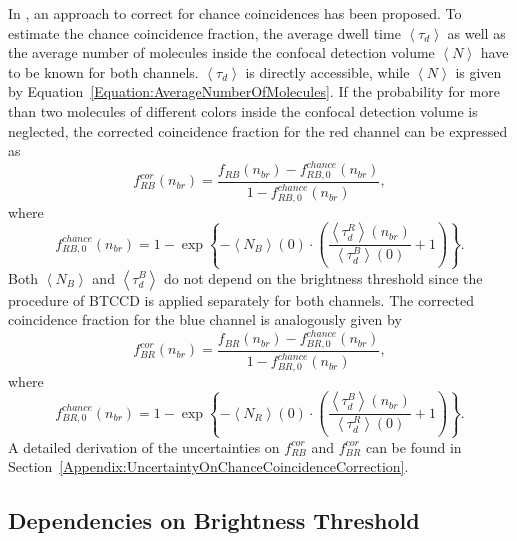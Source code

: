In \cite{Hoefig2020}, an approach to correct for chance coincidences has been proposed. To estimate the chance coincidence fraction, the average dwell time $\left\langle \tau_d \right\rangle$ as well as the average number of molecules inside the confocal detection volume $\left\langle N \right\rangle$ have to be known for both channels. $\left\langle \tau_d \right\rangle$ is directly accessible, while $\left\langle N \right\rangle$ is given by Equation~\ref{Equation:AverageNumberOfMolecules}.
If the probability for more than two molecules of different colors inside the confocal detection volume is neglected, the corrected coincidence fraction for the red channel can be expressed as
\begin{equation} \label{Equation:CorrectedCoincidenceFractionRed}
f_{RB}^{cor}(n_{br}) = \frac{f_{RB}(n_{br}) - f_{RB, 0}^{chance}(n_{br})}{1 - f_{RB, 0}^{chance}(n_{br})},
\end{equation}
where
\begin{equation} \label{Equation:ChanceCoincidenceFractionRed}
f_{RB, 0}^{chance}(n_{br}) = 1 - \exp\left\{-\left\langle N_B \right\rangle (0) \cdot \left(\frac{\left\langle \tau_d^R\right\rangle (n_{br})}{\left\langle \tau_d^B \right\rangle (0)} + 1\right)\right\}.
\end{equation}
Both $\left\langle N_B \right\rangle$ and $\left\langle \tau_d^B \right\rangle$ do not depend on the brightness threshold since the procedure of \gls{BTCCD} is applied separately for both channels. The corrected coincidence fraction for the blue channel is analogously given by
\begin{equation}
f_{BR}^{cor}(n_{br}) = \frac{f_{BR}(n_{br}) - f_{BR, 0}^{chance}(n_{br})}{1 - f_{BR, 0}^{chance}(n_{br})},
\end{equation}
where
\begin{equation}
f_{BR, 0}^{chance}(n_{br}) = 1 - \exp\left\{-\left\langle N_R \right\rangle (0) \cdot \left(\frac{\left\langle \tau_d^B \right\rangle (n_{br})}{\left\langle \tau_d^R \right\rangle (0)} + 1\right)\right\}.
\end{equation}
A detailed derivation of the uncertainties on $f_{RB}^{cor}$ and $f_{BR}^{cor}$ can be found in Section~\ref{Appendix:UncertaintyOnChanceCoincidenceCorrection}.

\clearpage

\subsection{Dependencies on Brightness Threshold} \label{Section:DerivedQuantities}

